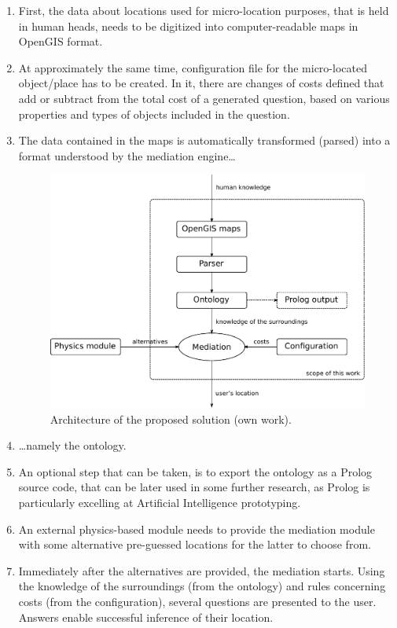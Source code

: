 \begin{enumerate}
	\item First, the data about locations used for micro-location purposes, that is held in human heads, needs to be digitized into computer-readable maps in OpenGIS format.
	\item At approximately the same time, configuration file for the micro-located object/place has to be created. In it, there are changes of costs defined that add or subtract from the total cost of a generated question, based on various properties and types of objects included in the question.
	\item The data contained in the maps is automatically transformed (parsed) into a format understood by the mediation engine\ldots
	
	\begin{figure}
		\centering
		\includegraphics[width=\textwidth]{architecture}
		\caption{Architecture of the proposed solution (own work).}
		\label{fig:architecture}
	\end{figure}
	
	\item \ldots{}namely the ontology.
	\item An optional step that can be taken, is to export the ontology as a Prolog source code, that can be later used in some further research, as Prolog is particularly excelling at Artificial Intelligence prototyping.
	\item An external physics-based module needs to provide the mediation module with some alternative pre-guessed locations for the latter to choose from.
	\item Immediately after the alternatives are provided, the mediation starts. Using the knowledge of the surroundings (from the ontology) and rules concerning costs (from the configuration), several questions are presented to the user. Answers enable successful inference of their location.
\end{enumerate}

